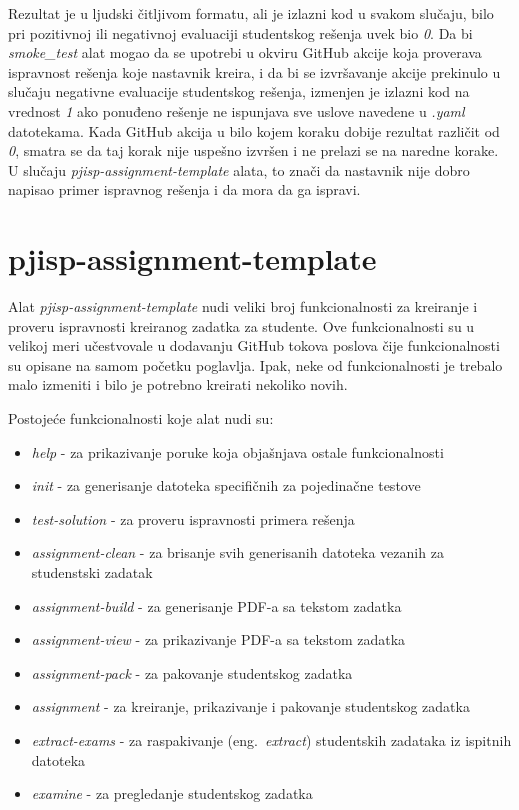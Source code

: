 \documentclass[12pt]{report}
\begin{document}
Rezultat je u ljudski čitljivom formatu, ali je izlazni kod u svakom slučaju, bilo pri pozitivnoj ili negativnoj evaluaciji studentskog rešenja uvek bio \textit{0}. Da bi \textit{smoke\_test} alat mogao da se upotrebi u okviru GitHub akcije koja proverava ispravnost rešenja koje nastavnik kreira, i da bi se izvršavanje akcije prekinulo u slučaju negativne evaluacije studentskog rešenja, izmenjen je izlazni kod na vrednost \textit{1} ako ponuđeno rešenje ne ispunjava sve uslove navedene u \textit{.yaml} datotekama. Kada GitHub akcija u bilo kojem koraku dobije rezultat različit od \textit{0}, smatra se da taj korak nije uspešno izvršen i ne prelazi se na naredne korake. U slučaju \textit{pjisp-assignment-template} alata, to znači da nastavnik nije dobro napisao primer ispravnog rešenja i da mora da ga ispravi.

\section{pjisp-assignment-template}
Alat \textit{pjisp-assignment-template} nudi veliki broj funkcionalnosti za kreiranje i proveru ispravnosti kreiranog zadatka za studente. Ove funkcionalnosti su u velikoj meri učestvovale u dodavanju GitHub tokova poslova čije funkcionalnosti su opisane na samom početku poglavlja. Ipak, neke od funkcionalnosti je trebalo malo izmeniti i bilo je potrebno kreirati nekoliko novih.

Postojeće funkcionalnosti koje alat nudi su:

\begin{itemize}
    \item \textit{help} - za prikazivanje poruke koja objašnjava ostale funkcionalnosti
    \item \textit{init} - za generisanje datoteka specifičnih za pojedinačne testove
    \item \textit{test-solution} - za proveru ispravnosti primera rešenja
    \item \textit{assignment-clean} - za brisanje svih generisanih datoteka vezanih za studenstski zadatak
    \item \textit{assignment-build} - za generisanje PDF-a sa tekstom zadatka
    \item \textit{assignment-view} - za prikazivanje PDF-a sa tekstom zadatka
    \item \textit{assignment-pack} - za pakovanje studentskog zadatka
    \item \textit{assignment} - za kreiranje, prikazivanje i pakovanje studentskog zadatka
    \item \textit{extract-exams} - za raspakivanje (eng.\ \textit{extract}) studentskih zadataka iz ispitnih datoteka
    \item \textit{examine} - za pregledanje studentskog zadatka
\end{itemize}
\end{document}
